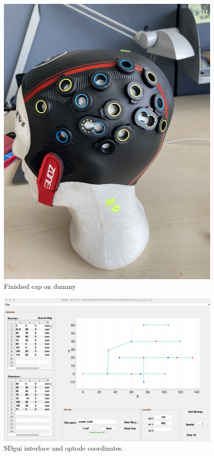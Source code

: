\begin{figure}[H]
\begin{minipage}[c]{.4\linewidth}
  \includegraphics[scale= 0.06, angle= -90, origin= c] {bilder/IMG_9768.jpg}
  \caption{Finished cap on dummy}
  \label{fig:FinishedCap}
\end{minipage}
\end{figure}

\begin{figure}[H]
  \centering
    \includegraphics[scale=.4]{bilder/SDgui.png}
  \caption{SDgui interface and optode coordinates.}
  \label{fig:sdgui}
\end{figure}


